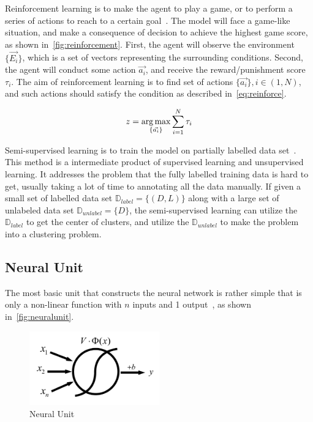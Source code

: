 \begin{spacing}{1.5}
Reinforcement learning is to make the agent to play a game, or to perform a series of actions to reach to a certain goal~\cite{barto2004reinforcement}. The model will face a game-like situation, and make a consequence of decision to achieve the highest game score, as shown in~\autoref{fig:reinforcement}. First, the agent will observe the environment $\{\vec{E_i}\}$, which is a set of vectors representing the surrounding conditions. Second, the agent will conduct some action $\vec{a_i}$, and receive the reward/punishment score $\tau_i$. The aim of reinforcement learning is to find set of actions $\{\vec{a_i}\}, i \in (1,N)$, and such actions should satisfy the condition as described in~\autoref{eq:reinforce}.

\begin{equation}
\label{eq:reinforce}
   z = \operatorname*{arg\,max}_{\{\vec{a_i}\}} \sum_{i=1}^{N} \tau_i
\end{equation}

Semi-supervised learning is to train the model on partially labelled data set~\cite{zhu2009introduction, zhu2005semi}. This method is a intermediate product of supervised learning and unsupervised learning. It addresses the problem that the fully labelled training data is hard to get, usually taking a lot of time to annotating all the data manually. If given a small set of labelled data set $\mathbb{D}_{label} = \{(D,L)\}$ along with a large set of unlabeled data set $\mathbb{D}_{unlabel} = \{D\}$, the semi-supervised learning can utilize the $\mathbb{D}_{label}$ to get the center of clusters, and utilize the $\mathbb{D}_{unlabel}$ to make the problem into a clustering problem.

\subsection{Neural Unit}
\label{subsec:neural_unit}

The most basic unit that constructs the neural network is rather simple that is only a non-linear function with $n$ inputs and 1 output~\cite{bengio2017deep}, as shown in~\autoref{fig:neuralunit}. 


\begin{figure}[ht]
\centering
\includegraphics[width=0.5\textwidth, fbox]{Chapter2/neuralunit.pdf}
\caption{Neural Unit}
\label{fig:neuralunit} 
\end{figure}



\end{spacing}
